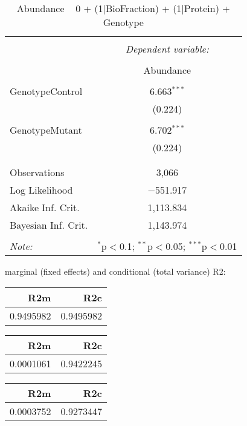 \documentclass[11pt]{report}
\begin{document}
\begin{table}[!htbp] \centering 
  \caption{Abundance ~ 0 + (1|BioFraction) + (1|Protein) + Genotype} 
  \label{} 
\begin{tabular}{@{\extracolsep{5pt}}lc} 
\\[-1.8ex]\hline 
\hline \\[-1.8ex] 
 & \multicolumn{1}{c}{\textit{Dependent variable:}} \\ 
\cline{2-2} 
\\[-1.8ex] & Abundance \\ 
\hline \\[-1.8ex] 
 GenotypeControl & 6.663$^{***}$ \\ 
  & (0.224) \\ 
  & \\ 
 GenotypeMutant & 6.702$^{***}$ \\ 
  & (0.224) \\ 
  & \\ 
\hline \\[-1.8ex] 
Observations & 3,066 \\ 
Log Likelihood & $-$551.917 \\ 
Akaike Inf. Crit. & 1,113.834 \\ 
Bayesian Inf. Crit. & 1,143.974 \\ 
\hline 
\hline \\[-1.8ex] 
\textit{Note:}  & \multicolumn{1}{r}{$^{*}$p$<$0.1; $^{**}$p$<$0.05; $^{***}$p$<$0.01} \\ 
\end{tabular} 
\end{table} 
marginal (fixed effects) and conditional (total variance) R2:

\begin{tabular}{r|r}
\hline
R2m & R2c\\
\hline
0.9495982 & 0.9495982\\
\hline
\end{tabular}

\begin{tabular}{r|r}
\hline
R2m & R2c\\
\hline
0.0001061 & 0.9422245\\
\hline
\end{tabular}

\begin{tabular}{r|r}
\hline
R2m & R2c\\
\hline
0.0003752 & 0.9273447\\
\hline
\end{tabular}
\end{document}

